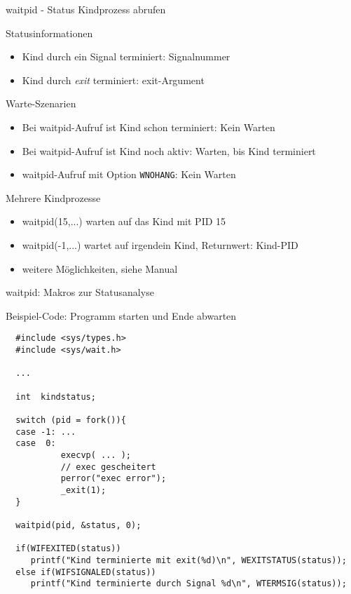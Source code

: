 \documentclass[utf8,9pt]{beamer}
\begin{document}
\begin{frame}[fragile]{waitpid - Status Kindprozess abrufen}{}

\begin{block}{Statusinformationen}
\begin{itemize}
\item Kind durch ein Signal terminiert: Signalnummer
\item Kind durch {\em exit\/} terminiert: exit-Argument
\end{itemize}
\end{block}

\begin{block}{Warte-Szenarien}
\begin{itemize}
\item Bei waitpid-Aufruf ist Kind schon terminiert: Kein Warten
\item Bei waitpid-Aufruf ist Kind noch aktiv: Warten, bis Kind terminiert
\item waitpid-Aufruf mit Option {\tt WNOHANG}: Kein Warten
\end{itemize}
\end{block}

\begin{block}{Mehrere Kindprozesse}
\begin{itemize}
\item waitpid(15,...) warten auf das Kind mit PID 15
\item waitpid(-1,...) wartet auf irgendein Kind, Returnwert: Kind-PID
\item weitere Möglichkeiten, siehe Manual
\end{itemize}

\end{block}


\end{frame}







\begin{frame}[fragile]{waitpid: Makros zur Statusanalyse}{}
\begin{block}{Beispiel-Code: Programm starten und Ende abwarten}
\footnotesize
\begin{verbatim}
  #include <sys/types.h>
  #include <sys/wait.h>

  ...

  int  kindstatus;

  switch (pid = fork()){
  case -1: ...
  case  0:
           execvp( ... );
           // exec gescheitert
           perror("exec error");
           _exit(1);
  }

  waitpid(pid, &status, 0);

  if(WIFEXITED(status))
     printf("Kind terminierte mit exit(%d)\n", WEXITSTATUS(status));
  else if(WIFSIGNALED(status))
     printf("Kind terminierte durch Signal %d\n", WTERMSIG(status));
  
\end{verbatim}
\end{block}

\end{frame}
\end{document}
